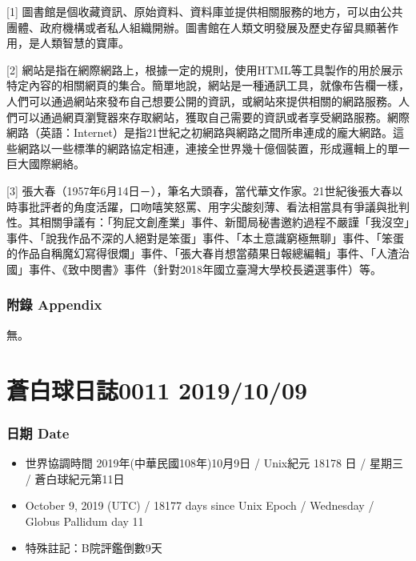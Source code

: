 \documentclass[a5paper, 12pt
]{book}
\providecommand{\tightlist}{%
  \setlength{\itemsep}{0pt}\setlength{\parskip}{0pt}}
\begin{document}
{[}1{]}
圖書館是個收藏資訊、原始資料、資料庫並提供相關服務的地方，可以由公共團體、政府機構或者私人組織開辦。圖書館在人類文明發展及歷史存留具顯著作用，是人類智慧的寶庫。

{[}2{]}
網站是指在網際網路上，根據一定的規則，使用HTML等工具製作的用於展示特定內容的相關網頁的集合。簡單地說，網站是一種通訊工具，就像布告欄一樣，人們可以通過網站來發布自己想要公開的資訊，或網站來提供相關的網路服務。人們可以通過網頁瀏覽器來存取網站，獲取自己需要的資訊或者享受網路服務。網際網路（英語：Internet）是指21世紀之初網路與網路之間所串連成的龐大網路。這些網路以一些標準的網路協定相連，連接全世界幾十億個裝置，形成邏輯上的單一巨大國際網絡。

{[}3{]}
張大春（1957年6月14日－），筆名大頭春，當代華文作家。21世紀後張大春以時事批評者的角度活躍，口吻嘻笑怒罵、用字尖酸刻薄、看法相當具有爭議與批判性。其相關爭議有：「狗屁文創產業」事件、新聞局秘書邀約過程不嚴謹「我沒空」事件、「說我作品不深的人絕對是笨蛋」事件、「本土意識窮極無聊」事件、「笨蛋的作品自稱魔幻寫得很爛」事件、「張大春肖想當蘋果日報總編輯」事件、「人渣治國」事件、《致中閔書》事件（針對2018年國立臺灣大學校長遴選事件）等。

\hypertarget{ux9644ux9304-appendix-3}{%
\subsubsection{附錄 Appendix}\label{ux9644ux9304-appendix-3}}

無。

\hypertarget{ux84bcux767dux7403ux65e5ux8a8c0011-20191009}{%
\section{蒼白球日誌0011
2019/10/09}\label{ux84bcux767dux7403ux65e5ux8a8c0011-20191009}}

\hypertarget{ux65e5ux671f-date-10}{%
\subsubsection{日期 Date}\label{ux65e5ux671f-date-10}}

\begin{itemize}
\tightlist
\item
  世界協調時間 2019年(中華民國108年)10月9日 / Unix紀元 18178 日 / 星期三
  / 蒼白球紀元第11日
\item
  October 9, 2019 (UTC) / 18177 days since Unix Epoch / Wednesday /
  Globus Pallidum day 11
\item
  特殊註記：B院評鑑倒數9天
\end{itemize}
\end{document}
